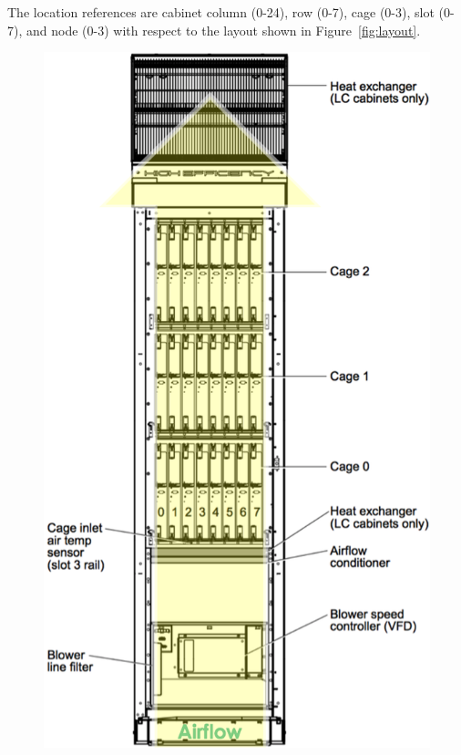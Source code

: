 The location references are cabinet column (0-24), row (0-7), cage
(0-3), slot (0-7), and node (0-3) with respect to the layout shown in
Figure~\ref{fig:layout}.
\begin{figure}
  \centering
  \begin{minipage}{0.49\columnwidth}
    \includegraphics[width=\columnwidth]{figs/TitanCabinet.png}
  \end{minipage}
  \begin{minipage}{0.49\columnwidth}

\end{minipage}
\end{figure}
